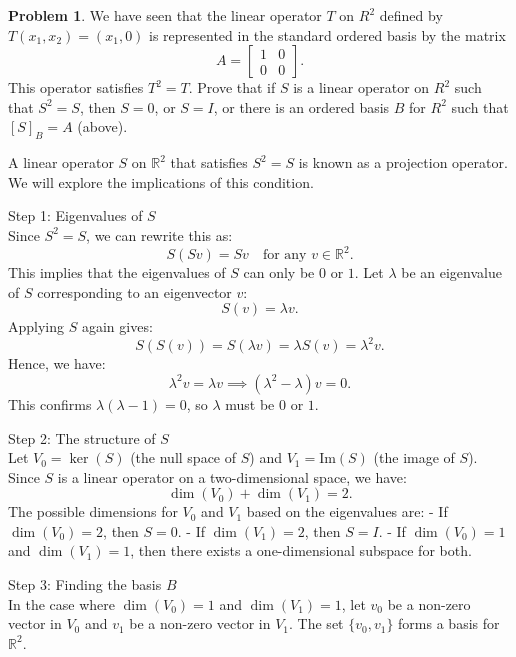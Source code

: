 \documentclass[12pt]{article}
\theoremstyle{definition}
\newtheorem{problem}{Problem}
\begin{document}
\begin{problem}
    We have seen that the linear operator $T$ on $R^2$ defined by $T(x_1, x_2) = (x_1, 0)$ is represented in the standard ordered basis by the matrix
    \begin{equation*}
        A = 
        \begin{bmatrix}
            1 & 0\\
            0 & 0
        \end{bmatrix}.
    \end{equation*}
    This operator satisfies $T^2 = T$. Prove that if $S$ is a linear operator on $R^2$ such that $S^2 = S$, then $S = 0$, or $S = I$, or there is an ordered
    basis $B$ for $R^2$ such that $[S]_{B} = A$ (above).

    \begin{solution}
        A linear operator \( S \) on \( \mathbb{R}^2 \) that satisfies \( S^2 = S \) is known as a projection operator. We will explore the implications of this condition.

        Step 1: Eigenvalues of \( S \)\\
        Since \( S^2 = S \), we can rewrite this as:
        \[
        S(Sv) = Sv \quad \text{for any } v \in \mathbb{R}^2.
        \]
        This implies that the eigenvalues of \( S \) can only be \( 0 \) or \( 1 \). Let \( \lambda \) be an eigenvalue of \( S \) corresponding to an eigenvector \( v \):
        \[
        S(v) = \lambda v.
        \]
        Applying \( S \) again gives:
        \[
        S(S(v)) = S(\lambda v) = \lambda S(v) = \lambda^2 v.
        \]
        Hence, we have:
        \[
        \lambda^2 v = \lambda v \implies (\lambda^2 - \lambda)v = 0.
        \]
        This confirms \( \lambda(\lambda - 1) = 0 \), so \( \lambda \) must be \( 0 \) or \( 1 \).

        Step 2: The structure of \( S \)\\
        Let \( V_0 = \ker(S) \) (the null space of \( S \)) and \( V_1 = \text{Im}(S) \) (the image of \( S \)). Since \( S \) is a linear operator on a two-dimensional space, we have:
        \[
        \dim(V_0) + \dim(V_1) = 2.
        \]
        The possible dimensions for \( V_0 \) and \( V_1 \) based on the eigenvalues are:
        - If \( \dim(V_0) = 2 \), then \( S = 0 \).
        - If \( \dim(V_1) = 2 \), then \( S = I \).
        - If \( \dim(V_0) = 1 \) and \( \dim(V_1) = 1 \), then there exists a one-dimensional subspace for both. 

        Step 3: Finding the basis \( B \)\\
        In the case where \( \dim(V_0) = 1 \) and \( \dim(V_1) = 1 \), let \( v_0 \) be a non-zero vector in \( V_0 \) and \( v_1 \) be a non-zero vector in \( V_1 \). The set \( \{ v_0, v_1 \} \) forms a basis for \( \mathbb{R}^2 \).


\end{solution}
\end{problem}
\end{document}
